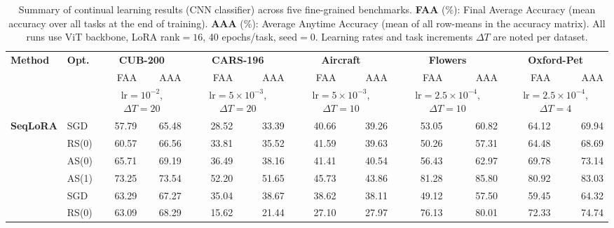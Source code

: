 
\begin{table}[ht]
\centering
\caption{%
  Summary of continual learning results (CNN classifier) across five fine-grained
  benchmarks.
  \textbf{FAA} (\%): Final Average Accuracy (mean accuracy over all tasks at the
  end of training).
  \textbf{AAA} (\%): Average Anytime Accuracy (mean of all row-means in the
  accuracy matrix).
  All runs use ViT backbone, LoRA rank$=16$, 40 epochs/task, seed$=0$.
  Learning rates and task increments $\Delta T$ are noted per dataset.
}
\label{tab:combine_cnn_detailed}
\setlength{\tabcolsep}{3.5pt}
\renewcommand{\arraystretch}{0.90}
\scriptsize
\begin{tabular}{@{}l l r r r r r r r r r r@{}}
\toprule
\textbf{Method} & \textbf{Opt.} & \multicolumn{2}{c}{\textbf{CUB-200}} & \multicolumn{2}{c}{\textbf{CARS-196}} & \multicolumn{2}{c}{\textbf{Aircraft}} & \multicolumn{2}{c}{\textbf{Flowers}} & \multicolumn{2}{c}{\textbf{Oxford-Pet}} \\
\cmidrule(lr){3-4}\cmidrule(lr){5-6}\cmidrule(lr){7-8}\cmidrule(lr){9-10}\cmidrule(lr){11-12}
 &  & FAA & AAA & FAA & AAA & FAA & AAA & FAA & AAA & FAA & AAA \\
 &  & \multicolumn{2}{c}{\scriptsize lr$=10^{-2}$, $\Delta T=20$} & \multicolumn{2}{c}{\scriptsize lr$=5\times10^{-3}$, $\Delta T=20$} & \multicolumn{2}{c}{\scriptsize lr$=5\times10^{-3}$, $\Delta T=10$} & \multicolumn{2}{c}{\scriptsize lr$=2.5\times10^{-4}$, $\Delta T=10$} & \multicolumn{2}{c}{\scriptsize lr$=2.5\times10^{-4}$, $\Delta T=4$} \\
\midrule
\multirow{4}{*}{\textbf{SeqLoRA}} & SGD & 57.79 & 65.48 & 28.52 & 33.39 & 40.66 & 39.26 & 53.05 & 60.82 & 64.12 & 69.94 \\
 & RS(0) & 60.57 & 66.56 & 33.81 & 35.52 & 41.59 & 39.63 & 50.26 & 57.31 & 64.48 & 68.69 \\
 & AS(0) & 65.71 & 69.19 & 36.49 & 38.16 & 41.41 & 40.54 & 56.43 & 62.97 & 69.78 & 73.14 \\
 & AS(1) & 73.25 & 73.54 & 52.20 & 51.65 & 45.73 & 43.86 & 81.28 & 85.80 & 80.92 & 83.03 \\
\addlinespace[3pt]
\multirow{4}{*}{\textbf{IncLoRA}} & SGD & 63.29 & 67.27 & 35.04 & 38.67 & 38.62 & 38.11 & 49.12 & 57.50 & 59.45 & 64.32 \\
 & RS(0) & 63.09 & 68.29 & 15.62 & 21.44 & 27.10 & 27.97 & 76.13 & 80.01 & 72.33 & 74.74 \\

\end{tabular}
\end{table}
